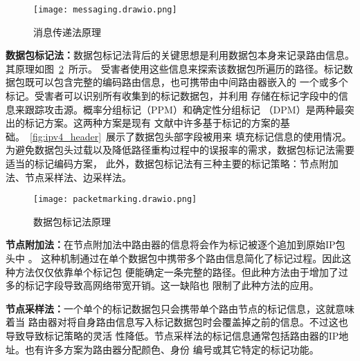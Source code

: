 \begin{figure}[htbp]
  \centering
  \texttt{[image: messaging.drawio.png]}
  \caption{消息传递法原理}
  \label{fig:messaging}
\end{figure}


\textbf{数据包标记法：}数据包标记法背后的关键思想是利用数据包本身来记录路由信息。其原理如图~\ref{fig:packet_marking}~所示。
受害者使用这些信息来探索该数据包所遍历的路径。标记数据包既可以包含完整的编码路由信息，也可携带由中间路由器嵌入的
一个或多个标记。受害者可以识别所有收集到的标记数据包，并利用
存储在标记字段中的信息来跟踪攻击源。概率分组标记（PPM）和确定性分组标记
（DPM）是两种最突出的标记方案\cite{Burch2000Tracing}。这两种方案是现有
文献中许多基于标记的方案的基础。~\ref{fig:ipv4_header}~展示了数据包头部字段被用来
填充标记信息的使用情况。
为避免数据包头过载以及降低路径重构过程中的误报率的需求，数据包标记法需要适当的标记编码方案，
此外，数据包标记法有三种主要的标记策略：节点附加法、节点采样法、边采样法\cite{Alenezi2011}。

\begin{figure}[htbp]
  \centering
  \texttt{[image: packetmarking.drawio.png]}
  \caption{数据包标记法原理}
  \label{fig:packet_marking}
\end{figure}

\textbf{节点附加法：}在节点附加法中路由器的信息将会作为标记被逐个追加到原始IP包头中
\cite{Amin2006,Min2003}。
这种机制通过在单个数据包中携带多个路由信息简化了标记过程。因此这种方法仅仅依靠单个标记包
便能确定一条完整的路径。但此种方法由于增加了过多的标记字段导致高网络带宽开销。这一缺陷也
限制了此种方法的应用。

\textbf{节点采样法：}一个单个的标记数据包只会携带单个路由节点的标记信息，这就意味着当
路由器对将自身路由信息写入标记数据包时会覆盖掉之前的信息。不过这也导致导致标记策略的灵活
性降低。节点采样法的标记信息通常包括路由器的IP地址。也有许多方案为路由器分配颜色、身份
编号或其它特定的标记功能\cite{Jin2009,Liu2006}。

